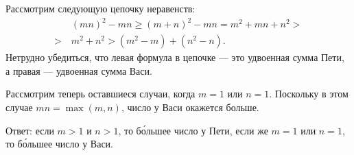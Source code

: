 \begin{itemize}
Рассмотрим следующую цепочку неравенств: 
\begin{align*}
	& (mn)^2 - mn \ge (m+n)^2 - mn = m^2 + mn + n^2 > \\
	>\ & m^2 + n^2 > (m^2 - m) + (n^2 - n).
\end{align*}
Нетрудно убедиться, что левая формула в цепочке --- это удвоенная сумма Пети, а правая --- удвоенная сумма Васи.

Рассмотрим теперь оставшиеся случаи, когда $m=1$ или $n=1$. Поскольку в этом случае
$mn = \max(m,n)$, число у Васи окажется больше.

Ответ: если $m>1$ и $n>1$, то б\'ольшее число у Пети, если же $m=1$ или $n=1$, то 
б\'ольшее число у Васи.

\end{itemize}
